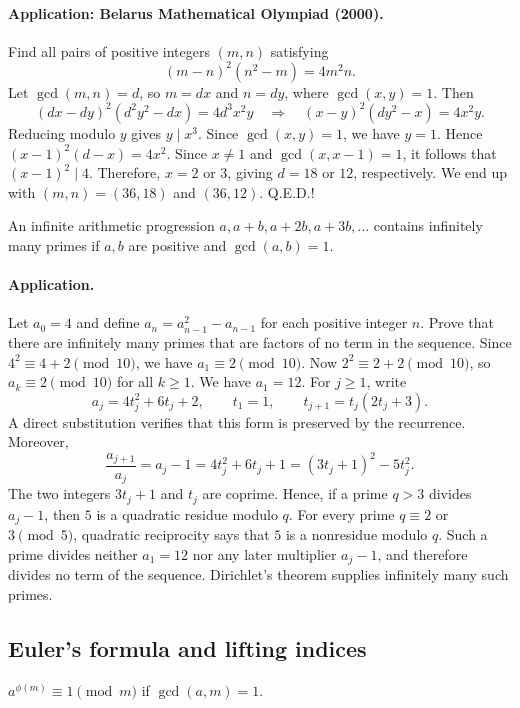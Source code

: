 \documentclass[11pt,a4paper]{article}
\begin{document}
\paragraph{Application: Belarus Mathematical Olympiad (2000).}
Find all pairs of positive integers $(m,n)$ satisfying
\[(m-n)^2(n^2-m)=4m^2n.\]
Let $\gcd(m,n)=d$, so $m=dx$ and $n=dy$, where $\gcd(x,y)=1$.
Then
\[(dx-dy)^2(d^2y^2-dx)=4d^3x^2y
\quad\Longrightarrow\quad (x-y)^2(dy^2-x)=4x^2y.\]
Reducing modulo $y$ gives $y\mid x^3$. Since $\gcd(x,y)=1$, we have $y=1$.
Hence $(x-1)^2(d-x)=4x^2$. Since $x\neq1$ and $\gcd(x,x-1)=1$, it follows that $(x-1)^2\mid4$.
Therefore, $x=2$ or $3$, giving $d=18$ or $12$, respectively.
We end up with $(m,n)=(36,18)$ and $(36,12)$. Q.E.D.!

\setcounter{theorem}{87}\begin{lemma}\label{lemma:lb1-90}
An infinite arithmetic progression $a,a+b,a+2b,a+3b,\ldots$ contains infinitely many primes if $a,b$ are positive and $\gcd(a,b)=1$.
\end{lemma}
\paragraph{Application.}
Let $a_0=4$ and define $a_n=a_{n-1}^2-a_{n-1}$ for each positive integer $n$.
Prove that there are infinitely many primes that are factors of no term in the sequence.
Since $4^2\equiv4+2\pmod{10}$, we have $a_1\equiv2\pmod{10}$.
Now $2^2\equiv2+2\pmod{10}$, so $a_k\equiv2\pmod{10}$ for all $k\geq1$.
We have $a_1=12$. For $j\geq1$, write
\[
a_j=4t_j^2+6t_j+2,
\qquad t_1=1,
\qquad t_{j+1}=t_j(2t_j+3).
\]
A direct substitution verifies that this form is preserved by the recurrence. Moreover,
\[
\frac{a_{j+1}}{a_j}=a_j-1=4t_j^2+6t_j+1=(3t_j+1)^2-5t_j^2.
\]
The two integers $3t_j+1$ and $t_j$ are coprime. Hence, if a prime
$q>3$ divides $a_j-1$, then $5$ is a quadratic residue modulo $q$.
For every prime $q\equiv2$ or $3\pmod5$, quadratic reciprocity says that
$5$ is a nonresidue modulo $q$. Such a prime divides neither $a_1=12$
nor any later multiplier $a_j-1$, and therefore divides no term of the
sequence. Dirichlet's theorem supplies infinitely many such primes.

\subsection{Euler's formula and lifting indices}
\setcounter{theorem}{92}\begin{lemma}\label{lemma:lb1-95}
$a^{\phi(m)}\equiv1\pmod m$ if $\gcd(a,m)=1$.
\end{lemma}
\end{document}
